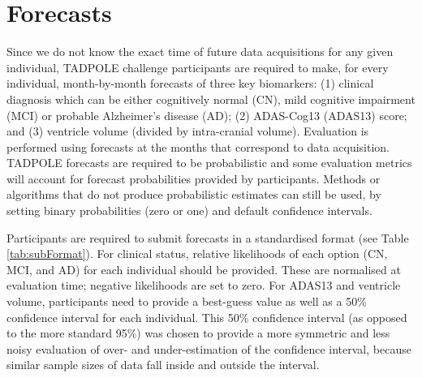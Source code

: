 \section{Forecasts}

Since we do not know the exact time of future data acquisitions for any given individual, TADPOLE challenge participants are required to make, for every individual, month-by-month forecasts of three key biomarkers: (1) clinical diagnosis which can be either cognitively normal (CN), mild cognitive impairment (MCI) or probable Alzheimer's disease (AD); (2) ADAS-Cog13 (ADAS13) score; and (3) ventricle volume (divided by intra-cranial volume). Evaluation is performed using forecasts at the months that correspond to data acquisition. TADPOLE forecasts are required to be probabilistic and some evaluation metrics will account for forecast probabilities provided by participants. Methods or algorithms that do not produce probabilistic estimates can still be used, by setting binary probabilities (zero or one) and default confidence intervals.

Participants are required to submit forecasts in a standardised format (see Table \ref{tab:subFormat}). For clinical status, relative likelihoods of each option (CN, MCI, and AD) for each individual should be provided. These are normalised at evaluation time; negative likelihoods are set to zero. For ADAS13 and ventricle volume, participants need to provide a best-guess value as well as a 50\% confidence interval for each individual. This 50\% confidence interval (as opposed to the more standard 95\%) was chosen to provide a more symmetric and less noisy evaluation of over- and under-estimation of the confidence interval, because similar sample sizes of data fall inside and outside the interval. 

\newcommand{\wi}{1.4cm}
\setlength\tabcolsep{3pt} %


